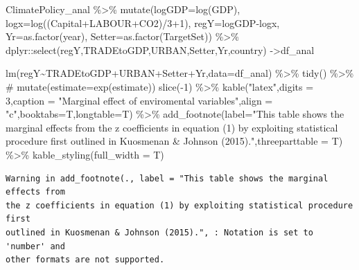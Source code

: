 \documentclass[
  letterpaper,
  DIV=11,
  numbers=noendperiod]{scrartcl}
\newenvironment{Shaded}{\begin{snugshade}}{\end{snugshade}}
\newcommand{\AttributeTok}[1]{\textcolor[rgb]{0.40,0.46,0.14}{#1}}
\newcommand{\CommentTok}[1]{\textcolor[rgb]{0.37,0.37,0.37}{#1}}
\newcommand{\DecValTok}[1]{\textcolor[rgb]{0.68,0.00,0.00}{#1}}
\newcommand{\FunctionTok}[1]{\textcolor[rgb]{0.28,0.35,0.67}{#1}}
\newcommand{\NormalTok}[1]{\textcolor[rgb]{0.00,0.46,0.62}{#1}}
\newcommand{\OtherTok}[1]{\textcolor[rgb]{0.00,0.46,0.62}{#1}}
\newcommand{\SpecialCharTok}[1]{\textcolor[rgb]{0.37,0.37,0.37}{#1}}
\newcommand{\StringTok}[1]{\textcolor[rgb]{0.13,0.47,0.30}{#1}}
\begin{document}
\begin{Shaded}
\begin{Highlighting}[]
\NormalTok{ClimatePolicy\_anal }\SpecialCharTok{\%\textgreater{}\%} \FunctionTok{mutate}\NormalTok{(}\AttributeTok{logGDP=}\FunctionTok{log}\NormalTok{(GDP),}
                   \AttributeTok{logx=}\FunctionTok{log}\NormalTok{((Capital}\SpecialCharTok{+}\NormalTok{LABOUR}\SpecialCharTok{+}\NormalTok{CO2)}\SpecialCharTok{/}\DecValTok{3}\SpecialCharTok{+}\DecValTok{1}\NormalTok{),}
                   \AttributeTok{regY=}\NormalTok{logGDP}\SpecialCharTok{{-}}\NormalTok{logx,}
                   \AttributeTok{Yr=}\FunctionTok{as.factor}\NormalTok{(year),}
                   \AttributeTok{Setter=}\FunctionTok{as.factor}\NormalTok{(TargetSet)) }\SpecialCharTok{\%\textgreater{}\%}
\NormalTok{  dplyr}\SpecialCharTok{::}\FunctionTok{select}\NormalTok{(regY,TRADEtoGDP,URBAN,Setter,Yr,country) }\OtherTok{{-}\textgreater{}}\NormalTok{df\_anal}

\FunctionTok{lm}\NormalTok{(regY}\SpecialCharTok{\textasciitilde{}}\NormalTok{TRADEtoGDP}\SpecialCharTok{+}\NormalTok{URBAN}\SpecialCharTok{+}\NormalTok{Setter}\SpecialCharTok{+}\NormalTok{Yr,}\AttributeTok{data=}\NormalTok{df\_anal) }\SpecialCharTok{\%\textgreater{}\%}
  \FunctionTok{tidy}\NormalTok{() }\SpecialCharTok{\%\textgreater{}\%}
  \CommentTok{\# mutate(estimate=exp(estimate))}
  \FunctionTok{slice}\NormalTok{(}\SpecialCharTok{{-}}\DecValTok{1}\NormalTok{) }\SpecialCharTok{\%\textgreater{}\%}
  \FunctionTok{kable}\NormalTok{(}\StringTok{"latex"}\NormalTok{,}\AttributeTok{digits =} \DecValTok{3}\NormalTok{,}\AttributeTok{caption =} \StringTok{"Marginal effect of enviromental variables"}\NormalTok{,}\AttributeTok{align =} \StringTok{"c"}\NormalTok{,}\AttributeTok{booktabs=}\NormalTok{T,}\AttributeTok{longtable=}\NormalTok{T) }\SpecialCharTok{\%\textgreater{}\%}
  \FunctionTok{add\_footnote}\NormalTok{(}\AttributeTok{label=}\StringTok{"This table shows the marginal effects from the z coefficients in equation (1) by exploiting statistical procedure first outlined in Kuosmenan \& Johnson (2015)."}\NormalTok{,}\AttributeTok{threeparttable =}\NormalTok{ T) }\SpecialCharTok{\%\textgreater{}\%}
  \FunctionTok{kable\_styling}\NormalTok{(}\AttributeTok{full\_width =}\NormalTok{ T)}
\end{Highlighting}
\end{Shaded}

\begin{verbatim}
Warning in add_footnote(., label = "This table shows the marginal effects from
the z coefficients in equation (1) by exploiting statistical procedure first
outlined in Kuosmenan & Johnson (2015).", : Notation is set to 'number' and
other formats are not supported.
\end{verbatim}
\end{document}
